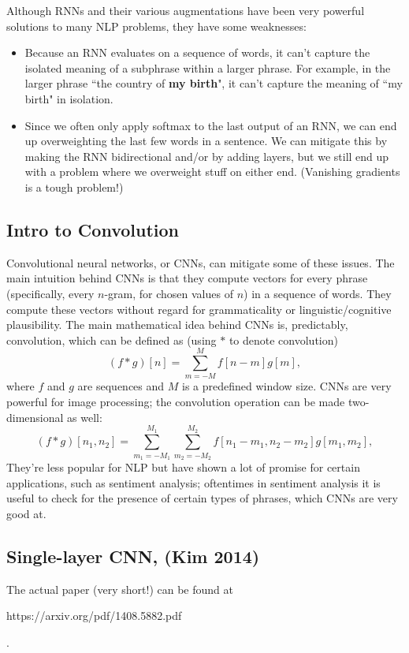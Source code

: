 Although RNNs and their various augmentations have been very powerful solutions to many NLP problems, they have some weaknesses:
\begin{itemize}
\item Because an RNN evaluates on a sequence of words, it can't capture the isolated meaning of a subphrase within a larger phrase. For example, in the larger phrase ``the country of \textbf{my birth}", it can't capture the meaning of ``my birth" in isolation.
\item Since we often only apply softmax to the last output of an RNN, we can end up overweighting the last few words in a sentence. We can mitigate this by making the RNN bidirectional and/or by adding layers, but we still end up with a problem where we overweight stuff on either end. (Vanishing gradients is a tough problem!)
\end{itemize}

\subsection{Intro to Convolution}

Convolutional neural networks, or CNNs, can mitigate some of these issues. The main intuition behind CNNs is that they compute vectors for every phrase (specifically, every $n$-gram, for chosen values of $n$) in a sequence of words. They compute these vectors without regard for grammaticality or linguistic/cognitive plausibility. The main mathematical idea behind CNNs is, predictably, convolution, which can be defined as (using $*$ to denote convolution)
$$(f * g)[n] = \sum_{m=-M}^M f[n-m]g[m],$$
where $f$ and $g$ are sequences and $M$ is a predefined window size. CNNs are very powerful for image processing; the convolution operation can be made two-dimensional as well:
$$(f * g)[n_1, n_2] = \sum_{m_1=-M_1}^{M_1} \sum_{m_2 = -M_2}^{M_2} f[n_1 - m_1, n_2 - m_2]g[m_1, m_2],$$
They're less popular for NLP but have shown a lot of promise for certain applications, such as sentiment analysis; oftentimes in sentiment analysis it is useful to check for the presence of certain types of phrases, which CNNs are very good at.

\subsection{Single-layer CNN, (Kim 2014)}
The actual paper (very short!) can be found at \begin{tt}https://arxiv.org/pdf/1408.5882.pdf\end{tt}.

